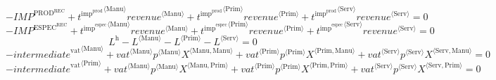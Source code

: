 \begin{equation}
-{I\!M\!P}^{\mathrm{PROD}^{\mathrm{REC}}} + {{t^{\mathrm{imp}^{\mathrm{prod}}}}^{\langle \mathrm{\mathrm{Manu}}\rangle}} {{{r\!e\!v\!e\!n\!u\!e}}^{\langle \mathrm{Manu}\rangle}} + {{t^{\mathrm{imp}^{\mathrm{prod}}}}^{\langle \mathrm{\mathrm{Prim}}\rangle}} {{{r\!e\!v\!e\!n\!u\!e}}^{\langle \mathrm{Prim}\rangle}} + {{t^{\mathrm{imp}^{\mathrm{prod}}}}^{\langle \mathrm{\mathrm{Serv}}\rangle}} {{{r\!e\!v\!e\!n\!u\!e}}^{\langle \mathrm{Serv}\rangle}} = 0
\end{equation}
\begin{equation}
-{I\!M\!P}^{\mathrm{ESPEC}^{\mathrm{REC}}} + {{t^{\mathrm{imp}^{\mathrm{espec}}}}^{\langle \mathrm{\mathrm{Manu}}\rangle}} {{{r\!e\!v\!e\!n\!u\!e}}^{\langle \mathrm{Manu}\rangle}} + {{t^{\mathrm{imp}^{\mathrm{espec}}}}^{\langle \mathrm{\mathrm{Prim}}\rangle}} {{{r\!e\!v\!e\!n\!u\!e}}^{\langle \mathrm{Prim}\rangle}} + {{t^{\mathrm{imp}^{\mathrm{espec}}}}^{\langle \mathrm{\mathrm{Serv}}\rangle}} {{{r\!e\!v\!e\!n\!u\!e}}^{\langle \mathrm{Serv}\rangle}} = 0
\end{equation}
\begin{equation}
L^{\mathrm{h}} - {L}^{\langle \mathrm{Manu}\rangle} - {L}^{\langle \mathrm{Prim}\rangle} - {L}^{\langle \mathrm{Serv}\rangle} = 0
\end{equation}
\begin{equation}
-{{i\!n\!t\!e\!r\!m\!e\!d\!i\!a\!t\!e}^{\mathrm{vat}}}^{\langle \mathrm{Manu}\rangle} + {{{v\!a\!t}}^{\langle \mathrm{\mathrm{Manu}}\rangle}} {{p}^{\langle \mathrm{Manu}\rangle}} {{X}^{\langle \mathrm{Manu},\mathrm{Manu}\rangle}} + {{{v\!a\!t}}^{\langle \mathrm{\mathrm{Prim}}\rangle}} {{p}^{\langle \mathrm{Prim}\rangle}} {{X}^{\langle \mathrm{Prim},\mathrm{Manu}\rangle}} + {{{v\!a\!t}}^{\langle \mathrm{\mathrm{Serv}}\rangle}} {{p}^{\langle \mathrm{Serv}\rangle}} {{X}^{\langle \mathrm{Serv},\mathrm{Manu}\rangle}} = 0
\end{equation}
\begin{equation}
-{{i\!n\!t\!e\!r\!m\!e\!d\!i\!a\!t\!e}^{\mathrm{vat}}}^{\langle \mathrm{Prim}\rangle} + {{{v\!a\!t}}^{\langle \mathrm{\mathrm{Manu}}\rangle}} {{p}^{\langle \mathrm{Manu}\rangle}} {{X}^{\langle \mathrm{Manu},\mathrm{Prim}\rangle}} + {{{v\!a\!t}}^{\langle \mathrm{\mathrm{Prim}}\rangle}} {{p}^{\langle \mathrm{Prim}\rangle}} {{X}^{\langle \mathrm{Prim},\mathrm{Prim}\rangle}} + {{{v\!a\!t}}^{\langle \mathrm{\mathrm{Serv}}\rangle}} {{p}^{\langle \mathrm{Serv}\rangle}} {{X}^{\langle \mathrm{Serv},\mathrm{Prim}\rangle}} = 0
\end{equation}

